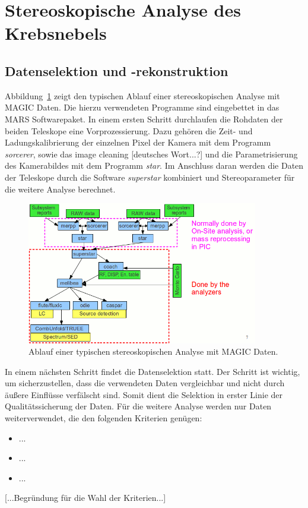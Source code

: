 \section{Stereoskopische Analyse des Krebsnebels}
\label{sec:analyse}

\subsection{Datenselektion und -rekonstruktion}

Abbildung~\ref{fig:analysischain} zeigt den typischen Ablauf einer
stereoskopischen Analyse mit MAGIC Daten. Die hierzu verwendeten Programme sind
eingebettet in das MARS Softwarepaket. In einem ersten Schritt durchlaufen die
Rohdaten der beiden Teleskope eine Vorprozessierung. Dazu gehören die Zeit- und
Ladungskalibrierung der einzelnen Pixel der Kamera mit dem Programm
\textit{sorcerer}, sowie das image cleaning [deutsches Wort...?] und die
Parametrisierung des Kamerabildes mit dem Programm \textit{star}. Im
Anschluss daran werden die Daten der Teleskope durch die Software
\textit{superstar} kombiniert und Stereoparameter für die weitere Analyse
berechnet.
\begin{figure}
  \centering
  \includegraphics[width=0.9\textwidth]{figures/analysischain.png}
  \caption{Ablauf einer typischen stereoskopischen Analyse mit MAGIC Daten.}
  \label{fig:analysischain}
\end{figure}
In einem nächsten Schritt findet die Datenselektion statt. Der Schritt ist
wichtig, um sicherzustellen, dass die verwendeten Daten vergleichbar und
nicht durch äußere Einflüsse verfälscht sind. Somit dient die Selektion in
erster Linie der Qualitätssicherung der Daten. Für die weitere Analyse werden
nur Daten weiterverwendet, die den folgenden Kriterien genügen:
\begin{itemize}
  \item ...
  \item ...
  \item ...
\end{itemize}
[...Begründung für die Wahl der Kriterien...]

